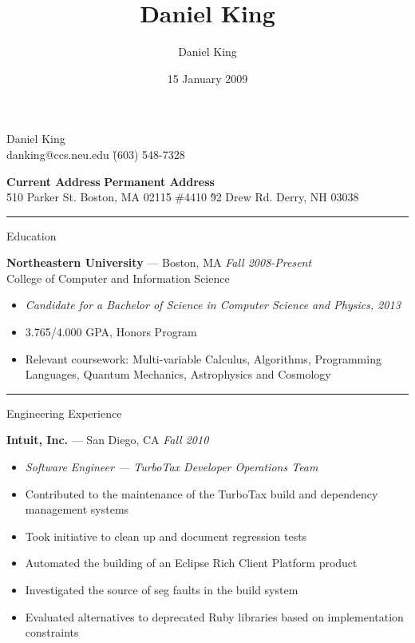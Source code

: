 \documentclass[10pt]{letter}
\author{Daniel King}
\title{Daniel King}
\date{15 January 2009}
\begin{document}
\begin{tabbing}{\Huge Daniel King} \\
\normalsize danking@ccs.neu.edu \`(603) 548-7328
\end{tabbing}

\vspace{-10pt}
\begin{tabbing}
\textbf{Current Address} \`\textbf{Permanent Address}\\
510 Parker St. Boston, MA 02115 \#4410 \`92 Drew Rd. Derry, NH 03038
\end{tabbing}\vspace{-15pt}
\rule{\linewidth}{.5pt}

{\Large Education}
\begin{tabbing}
{\large \bf Northeastern University} --- Boston, MA \` \textit{Fall 2008-Present} \\
College of Computer and Information Science
\end{tabbing}\vspace{-10pt}

\begin{itemize}
\setlength\itemsep{1pt}
\item[] \textit{Candidate for a Bachelor of Science in Computer Science and Physics, 2013}
\item 3.765/4.000 GPA, Honors Program
\item Relevant coursework: Multi-variable Calculus, Algorithms, Programming Languages, Quantum Mechanics, Astrophysics and Cosmology
\end{itemize}

\rule{\linewidth}{.5pt}

{\Large Engineering Experience}
\begin{tabbing}
{\large \bf Intuit, Inc.} --- San Diego, CA \` \textit{Fall 2010}

\end{tabbing}

\begin{itemize}
\setlength\itemsep{1pt}
\item [] \textit{Software Engineer --- TurboTax Developer Operations Team}
\item Contributed to the maintenance of the TurboTax build and dependency management systems
\item Took initiative to clean up and document regression tests
\item Automated the building of an Eclipse Rich Client Platform product
\item Investigated the source of seg faults in the build system
\item Evaluated alternatives to deprecated Ruby libraries based on implementation constraints
\end{itemize}
\end{document}
